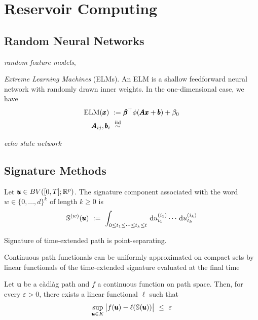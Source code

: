 \chapter{Reservoir Computing} 
\label{sec:RC}

\section{Random Neural Networks}

\emph{random feature models},

\emph{Extreme Learning Machines} (ELMs). An ELM is a shallow feedforward neural network with randomly drawn inner weights. In the one-dimensional case, we have
\begin{align*}
\textrm{ELM}(\pmb{x}) ~ :=& ~ \pmb{\beta}^\top \phi(\pmb{Ax} + \pmb{b}) + \beta_0 \\
\pmb{A}_{ij}, \pmb{b}_i ~ \stackrel{\textrm{iid}}{\sim} & ~ 
\end{align*}

\emph{echo state network}




\section{Signature Methods}

\begin{definition}[Signature]
Let $\pmb{u} \in BV([0,T]; \mathbb{R}^p)$. The signature component associated with the word $w \in \{0, ..., d\}^k$ of length $k \geq 0$ is
\begin{equation*}
\mathbb{S}^{(w)}(\pmb{u}) ~ := ~ \int_{0 \leq t_1 \leq \cdots \leq t_k \leq t} \, \textrm{d} u^{(i_1)}_{t_1} \cdots \, \textrm{d} u^{(i_k)}_{t_k}
\end{equation*}
\end{definition}

Signature of time-extended path is point-separating. 

Continuous path functionals can be uniformly approximated on compact sets by linear functionals of the time-extended signature evaluated at the final time

\begin{theorem}
Let $\pmb{u}$ be a càdlàg path and $f$ a continuous function on path space. Then, for every $\varepsilon > 0$, there exists a linear functional $\ell$ such that
\begin{equation*}
\sup_{\pmb{u} \in K} \big|f(\pmb{u}) - \ell(\mathbb{S}(\pmb{u})) \big| ~ \leq ~ \varepsilon
\end{equation*}
\end{theorem}

